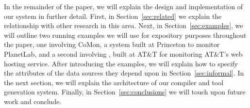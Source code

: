 In the remainder of the paper, we will explain the design and
implementation of our system in further detail.  First, in
Section~\ref{sec:related} we explain the relationship with other
research in this area.  Next, in Section~\ref{sec:examples}, we will
outline two running examples we will use for expository purposes
throughout the paper, one involving CoMon, a system built at Princeton
to monitor PlanetLab, and a second involving \ningaui{}, built at
AT\&T for monitoring AT\&T's web hosting service.  After introducing
the examples, we will explain how to specify the attributes of the
data sources they depend upon in Section~\ref{sec:informal}.  In the
next section, we will explain the architecture of our compiler and
tool generation system.  Finally, in Section~\ref{sec:conclusions} we
will touch upon future work and conclude.

